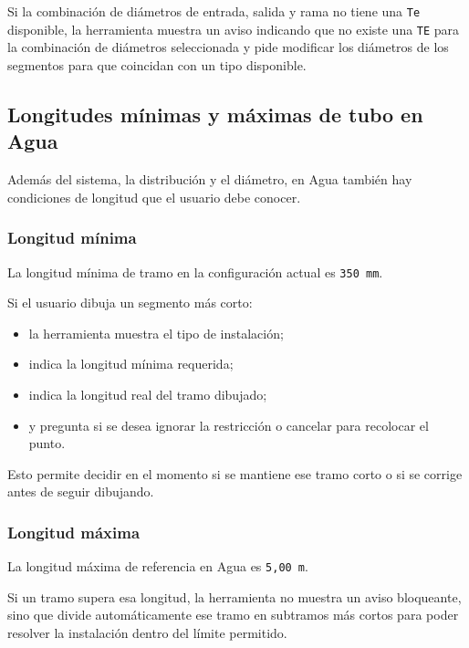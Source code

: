 Si la combinación de diámetros de entrada, salida y rama no tiene una \texttt{Te} disponible, la herramienta muestra un aviso indicando que no existe una \texttt{TE} para la combinación de diámetros seleccionada y pide modificar los diámetros de los segmentos para que coincidan con un tipo disponible.


\subsection{Longitudes mínimas y máximas de tubo en Agua}

Además del sistema, la distribución y el diámetro, en Agua también hay condiciones de longitud que el usuario debe conocer.

\subsubsection{Longitud mínima}

La longitud mínima de tramo en la configuración actual es \texttt{350 mm}.

Si el usuario dibuja un segmento más corto:

\begin{itemize}
\item la herramienta muestra el tipo de instalación;
\item indica la longitud mínima requerida;
\item indica la longitud real del tramo dibujado;
\item y pregunta si se desea ignorar la restricción o cancelar para recolocar el punto.
\end{itemize}

Esto permite decidir en el momento si se mantiene ese tramo corto o si se corrige antes de seguir dibujando.


\subsubsection{Longitud máxima}

La longitud máxima de referencia en Agua es \texttt{5,00 m}.

Si un tramo supera esa longitud, la herramienta no muestra un aviso bloqueante, sino que divide automáticamente ese tramo en subtramos más cortos para poder resolver la instalación dentro del límite permitido.

